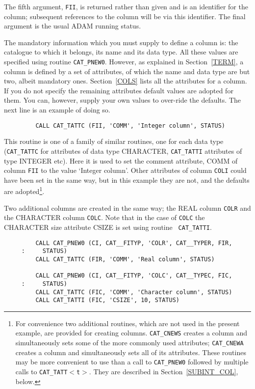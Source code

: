 The fifth argument, {\tt FII}, is returned rather than given and is an
identifier for the column; subsequent references to the column will be
via this identifier. The final argument is the usual ADAM running 
status.

The mandatory information which you must supply to define a column is:
the catalogue to which it belongs, its name and its data type. All these
values are specified using routine {\tt CAT\_PNEW0}. However, as
explained in Section~\ref{TERM}, a column is defined by a set of 
attributes, of which the name and data type are but two, albeit 
mandatory ones. Section~\ref{COLS} lists all the attributes for a 
column. If you do not specify the remaining attributes default
values are adopted for them. You can, however, supply your own values to
over-ride the defaults. The next line is an example of doing so.

\begin{verbatim}
         CALL CAT_TATTC (FII, 'COMM', 'Integer column', STATUS)
\end{verbatim}

This routine is one of a family of similar routines, one for each
data type ({\tt CAT\_TATTC} for attributes of data type CHARACTER,
{\tt CAT\_TATTI} attributes of type INTEGER etc). Here it is used
to set the comment attribute, COMM of column {\tt FII} to the
value `Integer column'. Other attributes of column {\tt COLI} could have
been set in the same way, but in this example they are not, and the 
defaults are adopted\footnote{For convenience two additional routines,
which are not used in the present example, are provided for creating 
columns. {\tt CAT\_CNEWS} creates a column and simultaneously sets some 
of the more commonly used attributes; {\tt CAT\_CNEWA} creates a column 
and simultaneously sets all of its attributes. These routines may be 
more convenient to use than a call to {\tt CAT\_PNEW0} followed by
multiple calls to {\tt CAT\_TATT$<$t$>$}. They are described in 
Section~\ref{SUBINT_COL}, below.}.

Two additional columns are created in the same way; the REAL column
{\tt COLR} and the CHARACTER column {\tt COLC}. Note that in the case of
{\tt COLC} the CHARACTER size attribute CSIZE is set using routine {\tt 
CAT\_TATTI}. 

\begin{verbatim}
         CALL CAT_PNEW0 (CI, CAT__FITYP, 'COLR', CAT__TYPER, FIR,
     :     STATUS)
         CALL CAT_TATTC (FIR, 'COMM', 'Real column', STATUS)

         CALL CAT_PNEW0 (CI, CAT__FITYP, 'COLC', CAT__TYPEC, FIC,
     :     STATUS)
         CALL CAT_TATTC (FIC, 'COMM', 'Character column', STATUS)
         CALL CAT_TATTI (FIC, 'CSIZE', 10, STATUS)
\end{verbatim}

